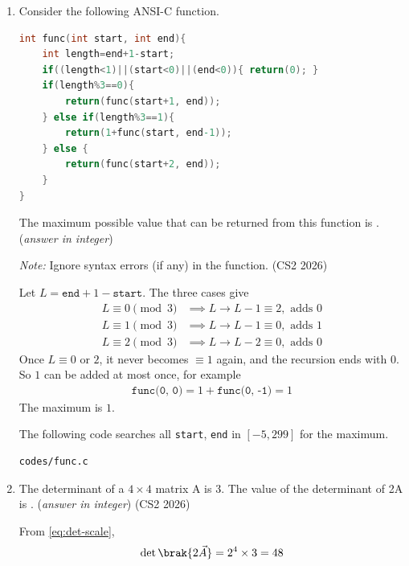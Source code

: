 \begin{enumerate}[label=\thesubsection.\arabic*, ref=\thesubsection.\theenumi]
\item Consider the following ANSI-C function.
\par\medskip\noindent\begin{minipage}{\linewidth}
\begin{lstlisting}[language=C]
int func(int start, int end){
    int length=end+1-start;
    if((length<1)||(start<0)||(end<0)){ return(0); }
    if(length%3==0){
        return(func(start+1, end));
    } else if(length%3==1){
        return(1+func(start, end-1));
    } else {
        return(func(start+2, end));
    }
}
\end{lstlisting}
\end{minipage}\par\medskip
The maximum possible value that can be returned from this function is
\underline{\hspace{1.5cm}}. (\textit{answer in integer})

\textit{Note:} Ignore syntax errors (if any) in the function.
\hfill (CS2 2026)

\solution Let $L = \texttt{end} + 1 - \texttt{start}$. The three cases give
\begin{align}
L \equiv 0 \pmod 3 &\implies L \to L - 1 \equiv 2, \text{ adds } 0 \\
L \equiv 1 \pmod 3 &\implies L \to L - 1 \equiv 0, \text{ adds } 1 \\
L \equiv 2 \pmod 3 &\implies L \to L - 2 \equiv 0, \text{ adds } 0
\end{align}
Once $L \equiv 0$ or $2$, it never becomes $\equiv 1$ again, and the
recursion ends with $0$. So $1$ can be added at most once, for example
\begin{align}
\texttt{func(0, 0)} = 1 + \texttt{func(0, -1)} = 1
\end{align}
The maximum is $1$.

The following code searches all \texttt{start}, \texttt{end} in $[-5, 299]$ for the maximum.
\begin{lstlisting}
codes/func.c
\end{lstlisting}

\item The determinant of a $4 \times 4$ matrix A is 3. The value of the
determinant of 2A is \underline{\hspace{1.5cm}}. (\textit{answer in
integer})
\hfill (CS2 2026)

\solution From \eqref{eq:det-scale},
\begin{align}
\det\brak{2\vec{A}} = 2^4 \times 3 = 48
\end{align}


\end{enumerate}
